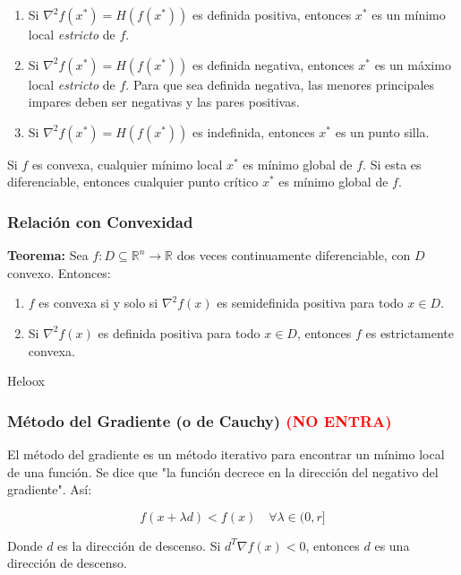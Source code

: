\documentclass{article}
\begin{document}
\begin{enumerate}
    \item Si $\nabla^2f(x^*)=H(f(x^*))$ es definida positiva, entonces $x^*$ es un mínimo local \textit{estricto} de $f$.
    \item Si $\nabla^2f(x^*)=H(f(x^*))$ es definida negativa, entonces $x^*$ es un máximo local \textit{estricto} de $f$. Para que sea definida negativa, las menores principales impares deben ser negativas y las pares positivas.
    \item Si $\nabla^2f(x^*)=H(f(x^*))$ es indefinida, entonces $x^*$ es un punto silla.
\end{enumerate}

Si $f$ es convexa, cualquier mínimo local $x^*$ es mínimo global de $f$. Si esta es diferenciable, entonces cualquier punto crítico $x^*$ es mínimo global de $f$.

\subsubsection{Relación con Convexidad}

\textbf{Teorema:} Sea $f:D \subseteq \mathbb{R}^n \to \mathbb{R}$ dos veces continuamente diferenciable, con $D$ convexo. Entonces:

\begin{enumerate}
    \item $f$ es convexa si y solo si $\nabla^2 f(x)$ es semidefinida positiva para todo $x \in D$.
    \item Si $\nabla^2 f(x)$ es definida positiva para todo $x \in D$, entonces $f$ es estrictamente convexa.
\end{enumerate}

Heloox
\subsubsection{Método del Gradiente (o de Cauchy) \textcolor{red}{(NO ENTRA)}}

El método del gradiente es un método iterativo para encontrar un mínimo local de una función. Se dice que "la función decrece en la dirección del negativo del gradiente". Así:

\begin{equation*}
    f(x+\lambda d) < f(x) \quad \forall \lambda \in (0, r]
\end{equation*}

Donde $d$ es la dirección de descenso. Si $d^T \nabla f(x) < 0$, entonces $d$ es una dirección de descenso.
\end{document}
